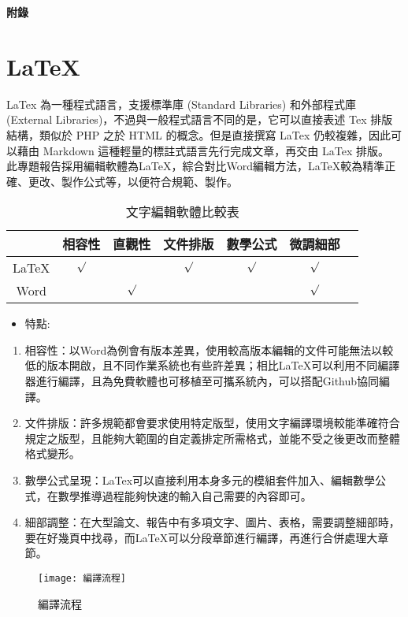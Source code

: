 \begin{appendix}
\renewcommand{\thesection}{\bf 附錄 \Alph{section}}%
\begin{center}
\fontsize{20pt}{0em}\selectfont\bf 附錄
\end{center}
\section*{LaTeX}
LaTex 為一種程式語言，支援標準庫 (Standard Libraries) 和外部程式庫 (External Libraries)，不過與一般程式語言不同的是，它可以直接表述 Tex 排版結構，類似於 PHP 之於 HTML 的概念。但是直接撰寫 LaTex 仍較複雜，因此可以藉由 Markdown 這種輕量的標註式語言先行完成文章，再交由 LaTex 排版。
此專題報告採用編輯軟體為LaTeX，綜合對比Word編輯方法，LaTeX較為精準正確、更改、製作公式等，以便符合規範、製作。
 \begin{table}[htbp] %
			\centering%
			\caption{文字編輯軟體比較表}%
			\large%
			\label{tab_文字編輯軟體比較表:scale}
			\begin{tabular}{|c|c|c|c|c|c|c|}
			\hline
			\diagbox[width=5em]& 相容性 & 直觀性 & 文件排版 & 數學公式 & 微調細部\\
			\hline
			LaTeX 		&$\surd$&		&$\surd$&$\surd$&$\surd$\\
			\hline
			Word	 	&		&$\surd$&		&		&$\surd$\\
			\hline
			
			\end{tabular}
		\end{table}	

\begin{itemize}
\item 特點:
\end{itemize}
\begin{enumerate}
\item 相容性：以Word為例會有版本差異，使用較高版本編輯的文件可能無法以較低的版本開啟，且不同作業系統也有些許差異；相比LaTeX可以利用不同編譯器進行編譯，且為免費軟體也可移植至可攜系統內，可以搭配Github協同編譯。
\item 文件排版：許多規範都會要求使用特定版型，使用文字編譯環境較能準確符合規定之版型，且能夠大範圍的自定義排定所需格式，並能不受之後更改而整體格式變形。
\item 數學公式呈現：LaTex可以直接利用本身多元的模組套件加入、編輯數學公式，在數學推導過程能夠快速的輸入自己需要的內容即可。
\item 細部調整：在大型論文、報告中有多項文字、圖片、表格，需要調整細部時，要在好幾頁中找尋，而LaTeX可以分段章節進行編譯，再進行合併處理大章節。
\end{enumerate}
\begin{figure}[hbt!]
\begin{center}
\texttt{[image: 編譯流程]}
\caption{\Large 編譯流程}
\label{fig.編譯流程}
\end{center}
\end{figure}
\end{appendix}

\newpage 
